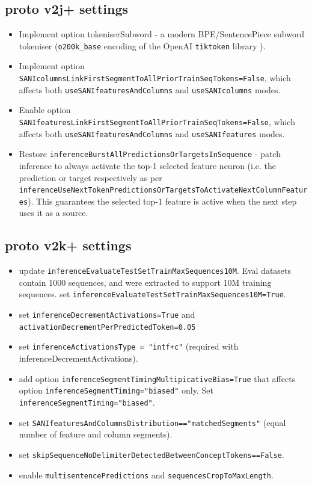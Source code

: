 \subsection{proto v2j+ settings}
\begin{itemize}
 	\item Implement option tokeniserSubword - a modern BPE/SentencePiece subword tokeniser (\texttt{o200k_base} encoding of the OpenAI \texttt{tiktoken} library \citep{openai2022tiktoken}).
    \item Implement option \texttt{SANIcolumnsLinkFirstSegmentToAllPriorTrainSeqTokens=False}, which affects both \texttt{useSANIfeaturesAndColumns} and \texttt{useSANIcolumns} modes.
    \item Enable option \texttt{SANIfeaturesLinkFirstSegmentToAllPriorTrainSeqTokens=False}, which affects both \texttt{useSANIfeaturesAndColumns} and \texttt{useSANIfeatures} modes.
    \item Restore \texttt{inferenceBurstAllPredictionsOrTargetsInSequence} - patch inference to always activate the top-1 selected feature neuron (i.e. the prediction or target respectively as per \texttt{inferenceUseNextTokenPredictionsOrTargetsToActivateNextColumnFeatures}). This guarantees the selected top-1 feature is active when the next step uses it as a source.
\end{itemize}

\subsection{proto v2k+ settings}
\begin{itemize}
	\item update \texttt{inferenceEvaluateTestSetTrainMaxSequences10M}. Eval datasets contain 1000 sequences, and were extracted to support 10M training sequences. set \texttt{inferenceEvaluateTestSetTrainMaxSequences10M=True}.
	\item set \texttt{inferenceDecrementActivations=True} and \texttt{activationDecrementPerPredictedToken=0.05}
	\item set \texttt{inferenceActivationsType = "intf+c"} (required with inferenceDecrementActivations).
	\item add option \texttt{inferenceSegmentTimingMultipicativeBias=True} that affects option \texttt{inferenceSegmentTiming="biased"} only. Set \texttt{inferenceSegmentTiming="biased"}.
	\item set \texttt{SANIfeaturesAndColumnsDistribution=="matchedSegments"} (equal number of feature and column segments).
	\item set \texttt{skipSequenceNoDelimiterDetectedBetweenConceptTokens==False}.
	\item enable \texttt{multisentencePredictions} and \texttt{sequencesCropToMaxLength}.
\end{itemize}

